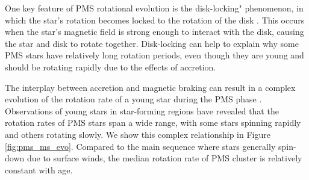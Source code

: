 One key feature of PMS rotational evolution is the disk-locking" phenomenon, in which the star's rotation becomes locked to the rotation of the disk \citep{eggenberger_angular_2012}.
This occurs when the star's magnetic field is strong enough to interact with the disk, causing the star and disk to rotate together.
Disk-locking can help to explain why some PMS stars have relatively long rotation periods, even though they are young and should be rotating rapidly due to the effects of accretion.

The interplay between accretion and magnetic braking can result in a complex evolution of the rotation rate of a young star during the PMS phase \citep{gallet_improved_2013}.
Observations of young stars in star-forming regions have revealed that the rotation rates of PMS stars span a wide range, with some stars spinning rapidly and others rotating slowly.
We show this complex relationship in Figure \ref{fig:pms_ms_evo}.
Compared to the main sequence where stars generally spin-down due to surface winds, the median rotation rate of PMS cluster is relatively constant with age.

